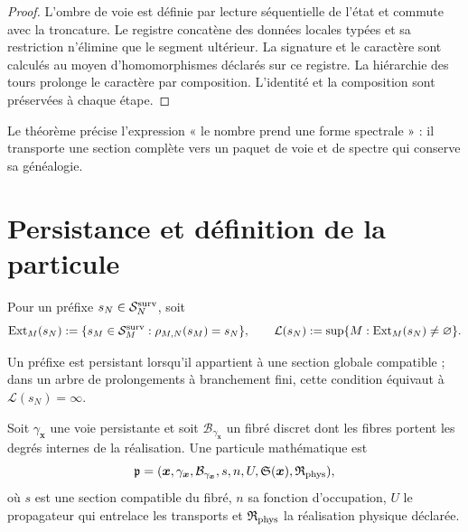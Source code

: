 \begin{proof}
L'ombre de voie est définie par lecture séquentielle de l'état et commute
avec la troncature. Le registre concatène des données locales typées et sa
restriction n'élimine que le segment ultérieur. La signature et le caractère
sont calculés au moyen d'homomorphismes déclarés sur ce registre. La
hiérarchie des tours prolonge le caractère par composition. L'identité et la
composition sont préservées à chaque étape.
\end{proof}

Le théorème précise l'expression « le nombre prend une forme spectrale » :
il transporte une section complète vers un paquet de voie et de spectre qui conserve
sa généalogie.

\section{Persistance et définition de la particule}

Pour un préfixe \(s_N\in\mathcal S_N^{\rm surv}\), soit
\[
 \operatorname{Ext}_M(s_N)
 :=\{s_M\in\mathcal S_M^{\rm surv}:\rho_{M,N}(s_M)=s_N\},
 \qquad
 \mathcal L(s_N)
 :=\sup\{M:\operatorname{Ext}_M(s_N)\neq\varnothing\}.
\]

\begin{definition}[Persistance]
\label{def:persistencia-bisagra-numero-particula}
Un préfixe est persistant lorsqu'il appartient à une section globale compatible ;
dans un arbre de prolongements à branchement fini, cette condition équivaut
à \(\mathcal L(s_N)=\infty\).
\end{definition}

\begin{definition}
\label{def:particula-matematica-bisagra}
Soit \(\gamma_{\boldsymbol x}\) une voie persistante et soit
\(\mathcal B_{\gamma_{\boldsymbol x}}\) un fibré discret dont les fibres
portent les degrés internes de la réalisation. Une particule mathématique est
\[
 \mathfrak p=
 (\boldsymbol x,
  \gamma_{\boldsymbol x},
  \mathcal B_{\gamma_{\boldsymbol x}},
  s,n,U,
  \mathfrak S(\boldsymbol x),
  \mathfrak R_{\rm phys}),
\]
où \(s\) est une section compatible du fibré, \(n\) sa fonction
d'occupation, \(U\) le propagateur qui entrelace les transports et
\(\mathfrak R_{\rm phys}\) la réalisation physique déclarée.
\end{definition}


